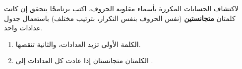 \begin{statement}
لاكتشاف الحسابات المكررة بأسماء مقلوبة الحروف، اكتب برنامجًا يتحقق إن كانت كلمتان \textbf{متجانستين} (نفس الحروف بنفس التكرار، بترتيب مختلف) باستعمال جدول عدادات واحد.
\end{statement}
\begin{stepsbox}\begin{enumerate}
\item الكلمة الأولى تزيد العدادات، والثانية تنقصها.
\item الكلمتان متجانستان إذا عادت كل العدادات إلى .
\end{enumerate}\end{stepsbox}
